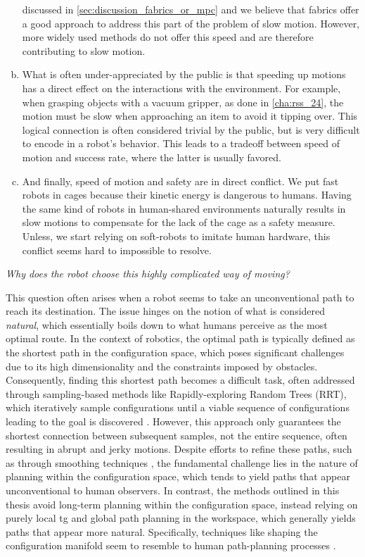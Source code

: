 \begin{enumerate}[(a)]
    discussed in \cref{sec:discussion_fabrics_or_mpc} and we
    believe that \ac{fabrics} offer a good approach to
    address this part of the problem of slow motion.
    However, more widely used methods do not offer this
    speed and are therefore contributing to slow motion.
  \item What is often under-appreciated by the public is
    that speeding up motions has a direct effect on the
    interactions with the environment. For example, when
    grasping objects with a vacuum gripper, as done in 
    \cref{cha:rss_24}, the motion must be slow when
    approaching an item to avoid it tipping over. This
    logical connection is often considered trivial by the
    public, but is very difficult to encode in a robot's
    behavior. This leads to a tradeoff between speed of
    motion and success rate, where the latter is usually
    favored.
  \item And finally, speed of motion and safety are in direct
    conflict. We put fast robots in cages because their
    kinetic energy is dangerous to humans. Having the same
    kind of robots in human-shared environments naturally 
    results in slow motions to compensate for the lack of
    the cage as a safety measure. Unless, we start relying
    on soft-robots to imitate human hardware, this conflict
    seems hard to impossible to resolve.
\end{enumerate}

\textit{Why does the robot choose this highly complicated
way of moving?}

This question often arises when a robot seems to take an
unconventional path to reach its destination. The issue
hinges on the notion of what is considered \textit{natural},
which essentially boils down to what humans perceive as the
most optimal route. In the context of robotics, the optimal
path is typically defined as the shortest path in the
configuration space, which poses significant challenges due
to its high dimensionality and the constraints imposed by
obstacles. Consequently, finding this shortest path becomes
a difficult task, often addressed through sampling-based
methods like Rapidly-exploring Random Trees (RRT), which
iteratively sample configurations until a viable sequence of
configurations leading to the goal is discovered
\cite{Karaman2011}. However, this approach only guarantees
the shortest connection between subsequent samples, not the
entire sequence, often resulting in abrupt and jerky
motions. Despite efforts to refine these paths, such as
through smoothing techniques
\cite{siegwart2011introduction}, the fundamental challenge
lies in the nature of planning within the configuration
space, which tends to yield paths that appear unconventional
to human observers. In contrast, the methods outlined in
this thesis avoid long-term planning within the
configuration space, instead relying on purely local \ac{tg}
and global path planning in the workspace, which generally
yields paths that appear more natural. Specifically,
techniques like shaping the configuration manifold seem to
resemble to human path-planning processes
\cite{klein2022riemannian}.

